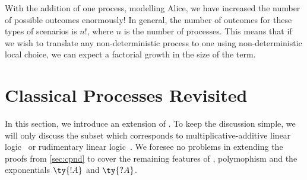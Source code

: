 \documentclass[UKenglish]{llncs}
\begin{document}
\begin{center}
\end{center}
With the addition of one process, modelling Alice, we have increased the number
of possible outcomes enormously! In general, the number of outcomes for these
types of scenarios is $n!$, where $n$ is the number of processes. This means
that if we wish to translate any non-deterministic process to one using
non-deterministic local choice, we can expect a factorial growth in the size of
the term.

\section{Classical Processes Revisited}\label{sec:cp-revisited}

In this section, we introduce an extension of \cp.
To keep the discussion simple, we will only discuss the subset which corresponds
to multiplicative-additive linear logic~\cite[MALL]{girard1987} or rudimentary
linear logic~\cite[RLL]{girard1992}.
We foresee no problems in extending the proofs from \cref{sec:cpnd} to
cover the remaining features of \cp, polymophism and the exponentials $\ty{!A}$
and $\ty{?A}$. 
\end{document}
